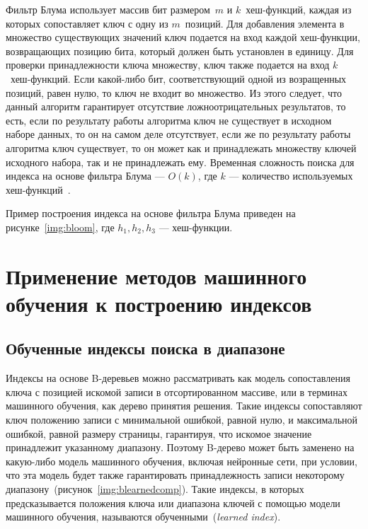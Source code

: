 Фильтр Блума использует массив бит размером~$m$ и $k$~хеш-функций, каждая из
которых сопоставляет ключ с одну из $m$~позиций. Для добавления элемента в
множество существующих значений ключ подается на вход каждой хеш-функции,
возвращающих позицию бита, который должен быть установлен в единицу. Для
проверки принадлежности ключа множеству, ключ также подается на вход
$k$~хеш-функций.  Если какой-либо бит, соответствующий одной из возращенных
позиций, равен нулю, то ключ не входит во множество. Из этого следует, что
данный алгоритм гарантирует отсутствие ложноотрицательных результатов, то есть,
если по результату работы алгоритма ключ не существует в исходном наборе данных,
то он на самом деле отсутствует, если же по результату работы алгоритма ключ
существует, то он может как и принадлежать множеству ключей исходного набора,
так и не принадлежать ему. Временная сложность поиска для индекса на основе
фильтра Блума --- $O(k)$, где $k$ --- количество используемых
хеш-функций~\cite{ship}.

Пример построения индекса на основе фильтра Блума приведен на
рисунке~\ref{img:bloom}, где $h_1, h_2, h_3$ --- хеш-функции.


\section{Применение методов машинного обучения к построению индексов}

\subsection{Обученные индексы поиска в диапазоне}

Индексы на основе B-деревьев можно рассматривать как модель сопоставления ключа
с позицией искомой записи в отсортированном массиве, или в терминах машинного
обучения, как дерево принятия решения. Такие индексы сопоставляют ключ положению
записи с минимальной ошибкой, равной нулю, и максимальной ошибкой, равной
размеру страницы, гарантируя, что искомое значение принадлежит указанному
диапазону. Поэтому B-дерево может быть заменено на какую-либо модель машинного
обучения, включая нейронные сети, при условии, что эта модель будет также
гарантировать принадлежность записи некоторому
диапазону~(рисунок~\ref{img:blearnedcomp}). Такие индексы, в которых
предсказывается положения ключа или диапазона ключей с помощью модели машинного
обучения, называются обученными~(\textit{learned index}).

